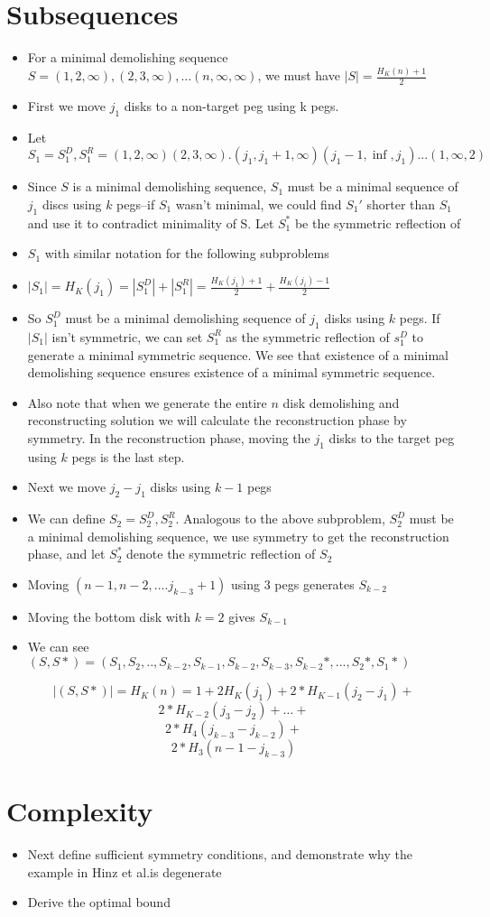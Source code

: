 \documentclass{article}
\begin{document}
\section{Subsequences}
\begin{itemize}
\item For a minimal demolishing sequence $S={(1,2,\infty),(2,3,\infty),...(n,\infty,\infty)}$,
we must have $|S|=\frac{H_K(n)+1}{2}$
\item First we move $j_1$ disks to a non-target peg using k pegs.
\item Let $S_1={S_1^D,S_1^R}={{(1,2,\infty)(2,3,\infty).(j_1,j_1+1,\infty)}{(j_1-1,\inf,j_1)...(1,\infty,2)}}$
\item Since $S$ is a minimal demolishing sequence, $S_1$ must be a minimal sequence of $j_1$ discs using $k$ pegs--if $S_1$ wasn't minimal, we could find $S_1'$ shorter than $S_1$ and use it to contradict minimality of S. Let $S_1^*$ be the symmetric reflection of \item $S_1$ with similar notation for the following subproblems
\item $|S_1|=H_K(j_1)=|S_1^D|+|S_1^R|=\frac{H_K(j_1)+1}{2}+\frac{H_K(j_i)-1}{2}$
\item So $S_1^D$ must be a minimal demolishing sequence of $j_1$ disks using $k$ pegs. If $|S_1|$ isn't symmetric, we can set $S_1^R$ as the symmetric reflection of $s_1^D$ to generate a minimal symmetric sequence. We see that existence of a minimal demolishing sequence ensures existence of a minimal symmetric sequence.
\item Also note that when we generate the entire $n$ disk demolishing and reconstructing solution we will calculate the reconstruction phase by symmetry. In the reconstruction phase, moving the $j_1$ disks to the target peg using $k$ pegs is the last step.
\item Next we move $j_2-j_1$ disks using $k-1$ pegs
\item We can define $S_2={S_2^D,S_2^R}$. Analogous to the above subproblem, $S_2^D$ must be a minimal demolishing sequence, we use symmetry to get the reconstruction phase, and let $S_2^*$ denote the symmetric reflection of $S_2$
\item Moving $(n-1,n-2,....j_{k-3}+1)$ using $3$ pegs generates $S_{k-2}$
\item Moving the bottom disk with $k=2$ gives $S_{k-1}$
\item We can see $(S,S*)=(S_1,S_2,..,S_{k-2},S_{k-1},S_{k-2},S_{k-3},S_{k-2}*,...,S_2*,S_1*)$
\end{itemize}
$$|(S,S*)|=H_K(n)=1+2H_K(j_1)+2*H_{K-1}(j_2-j_1)+$$
$$2*H_{K-2}(j_3-j_2)+\dots+$$
$$2*H_{4}(j_{k-3}-j_{k-2})+$$
$$2*H_{3}(n-1-j_{k-3})$$

\section{Complexity}
\begin{itemize}
\item Next define sufficient symmetry conditions, and demonstrate why the example in Hinz et al.is degenerate
\item Derive the optimal bound

\end{itemize}
\end{document}
